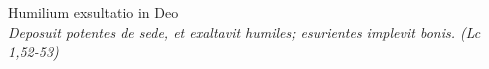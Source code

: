 


\def\greinitialformat#1{%
{\fontsize{39}{39}\selectfont #1}%
}




\vspace{0.3cm}
\begin{center}

Humilium exsultatio in Deo\\
\textit{\small Deposuit potentes de sede, et exaltavit humiles; esurientes implevit bonis. (Lc 1,52-53)}
\end{center}
